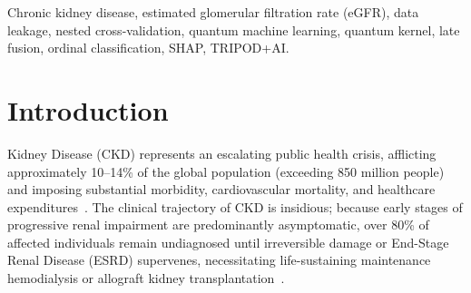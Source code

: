 \documentclass[conference]{IEEEtran}
\begin{document}
\begin{abstract}
\textbf{\textit{Results:}} Continuous log-eGFR regression with post-hoc clinical binning proved superior across all benchmarks, achieving a Quadratic Weighted Kappa (QWK) of 0.8204 (95\% CI: [0.8114, 0.8298]) and 95.2\% within $\pm 1$ grade accuracy on 5-class staging, and 0.8563 QWK ([0.8425, 0.8711]) with 0.7701 Macro-F1 and 81.45\% accuracy on 3-class triage. The Quantum Fidelity Kernel yielded higher mathematical KTA (0.1957 vs. 0.1170) but lower held-out generalization (QWK 0.7109 vs. 0.7763) than classical RBF kernels. Paired bootstrap testing demonstrated that late fusion caused a statistically significant drop in Macro-F1 ($\Delta = -0.0481$, 95\% CI: [$-0.0918, -0.0046$]) while the QWK difference spanned zero ($\Delta = -0.0057$, 95\% CI: [$-0.0269, +0.0154$]), disproving claims of quantum advantage.
\textbf{\textit{Conclusion:}} Secondary hematologic, metabolic, and urinalysis biomarkers provide robust clinical surrogacy for renal triage when formulated as continuous ordinal regression, whereas current NISQ quantum-kernel techniques offer no demonstrable advantage on small tabular clinical datasets.
\end{abstract}

\begin{IEEEkeywords}
Chronic kidney disease, estimated glomerular filtration rate (eGFR), data leakage, nested cross-validation, quantum machine learning, quantum kernel, late fusion, ordinal classification, SHAP, TRIPOD+AI.
\end{IEEEkeywords}

\section{Introduction}

 Kidney Disease (CKD) represents an escalating public health crisis, afflicting approximately 10--14\% of the global population (exceeding 850 million people) and imposing substantial morbidity, cardiovascular mortality, and healthcare expenditures~\cite{kdigo2013, bickbov2020global}. The clinical trajectory of CKD is insidious; because early stages of progressive renal impairment are predominantly asymptomatic, over 80\% of affected individuals remain undiagnosed until irreversible damage or End-Stage Renal Disease (ESRD) supervenes, necessitating life-sustaining maintenance hemodialysis or allograft kidney transplantation~\cite{levin2017global}.
\end{document}
